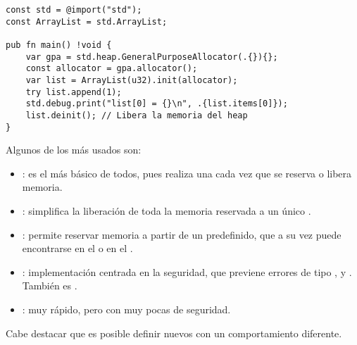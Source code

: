 \begin{listing}[h]
\begin{verbatim}
const std = @import("std");
const ArrayList = std.ArrayList;

pub fn main() !void {
    var gpa = std.heap.GeneralPurposeAllocator(.{}){};
    const allocator = gpa.allocator();
    var list = ArrayList(u32).init(allocator);
    try list.append(1);
    std.debug.print("list[0] = {}\n", .{list.items[0]});
    list.deinit(); // Libera la memoria del heap
}
\end{verbatim}
\caption{Inicialización de una lista en el  por medio de un \lstinline{GeneralPurposeAllocator}, en Zig}
\label{code:aes:zig_gpa}
\end{listing}

Algunos de los  más usados son:

\begin{itemize}
    \item {}: es el más básico de todos, pues realiza una  cada vez que se reserva o libera memoria.
    \item {}: simplifica la liberación de toda la memoria reservada a un único .
    \item {}: permite reservar memoria a partir de un  predefinido, que a su vez puede encontrarse en el  o en el .
    \item {}: implementación centrada en la seguridad, que previene errores de tipo ,  y . También es .
    \item {}: muy rápido, pero con muy pocas  de seguridad.
\end{itemize}

Cabe destacar que es posible definir nuevos  con un comportamiento diferente.
